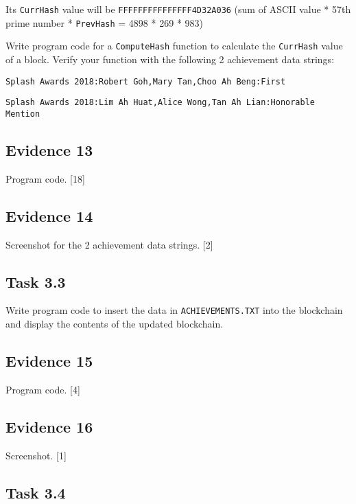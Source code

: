 Its \texttt{CurrHash} value will be \texttt{FFFFFFFFFFFFFFF4D32A036}
(sum of ASCII value {*} 57th prime number {*} \texttt{PrevHash} =
4898 {*} 269 {*} 983)

Write program code for a \texttt{ComputeHash} function to calculate
the \texttt{CurrHash} value of a block. Verify your function with
the following 2 achievement data strings:

\noindent %
\noindent\begin{minipage}[t]{1\columnwidth}%
\texttt{Splash Awards 2018:Robert Goh,Mary Tan,Choo Ah Beng:First}

\texttt{Splash Awards 2018:Lim Ah Huat,Alice Wong,Tan Ah Lian:Honorable
Mention}%
\end{minipage}

\subsection*{Evidence 13 }

Program code. \hfill{}{[}18{]}

\subsection*{Evidence 14}

Screenshot for the 2 achievement data strings. \hfill{}{[}2{]}

\subsection*{Task 3.3 }

Write program code to insert the data in \texttt{ACHIEVEMENTS.TXT}
into the blockchain and display the contents of the updated blockchain.

\subsection*{Evidence 15}

Program code.\hfill{} {[}4{]}

\subsection*{Evidence 16}

Screenshot. \hfill{}{[}1{]}

\subsection*{Task 3.4}

